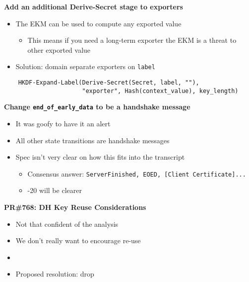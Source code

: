 \documentclass[helvetica]{seminar}
\newcommand{\heading}[1]{%
  \begin{center} 
    \large\bf 
    #1 
  \end{center} 
  \vspace{.4 in}}
\begin{document}
\begin{slide}
\heading{Add an additional Derive-Secret stage to exporters}

\begin{itemize}
\item The EKM can be used to compute any exported value
  \begin{itemize}
  \item This means if you need a long-term exporter the EKM is a threat to other exported value
  \end{itemize}
\item Solution: domain separate exporters on \verb^label^
\end{itemize}

{\small
\begin{verbatim}
    HKDF-Expand-Label(Derive-Secret(Secret, label, ""),
                      "exporter", Hash(context_value), key_length)
\end{verbatim}
}
\end{slide}


\begin{slide}
\heading{Change \texttt{end\_of\_early\_data} to be a handshake message}

\begin{itemize}
\item It was goofy to have it an alert
\item All other state transitions are handshake messages
\item Spec isn't very clear on how this fits into the transcript
  \begin{itemize}
  \item Consensus answer: \verb^ServerFinished, EOED, [Client Certificate]...^
  \item -20 will be clearer
  \end{itemize}
\end{itemize}
\end{slide}


\begin{slide}
\heading{PR\#768: DH Key Reuse Considerations}

\begin{itemize}
\item Not that confident of the analysis
\item We don't really want to encourage re-use
\item[]
\item Proposed resolution: drop
\end{itemize}
\end{slide}
\end{document}

